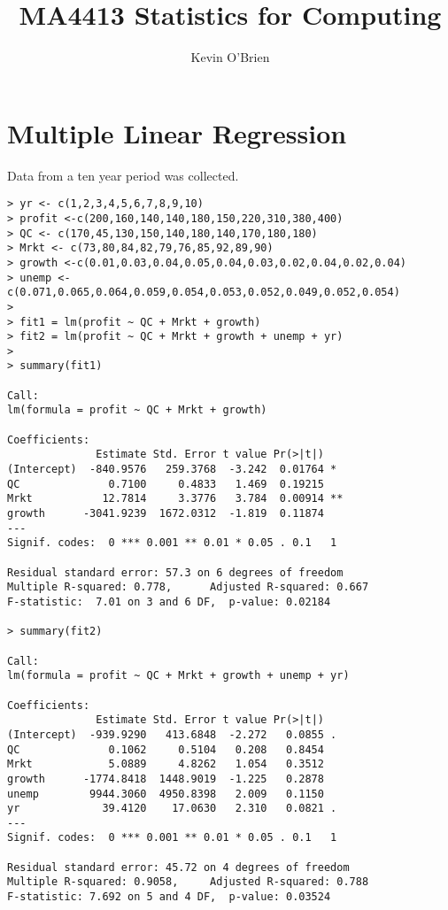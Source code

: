 \documentclass[10pt,a4paper]{article}
\title{MA4413 Statistics for Computing}
\author{Kevin O'Brien}
\begin{document}
\section{Multiple Linear Regression}
Data from a ten year period was collected.

\begin{verbatim}
> yr <- c(1,2,3,4,5,6,7,8,9,10)
> profit <-c(200,160,140,140,180,150,220,310,380,400)
> QC <- c(170,45,130,150,140,180,140,170,180,180)
> Mrkt <- c(73,80,84,82,79,76,85,92,89,90)
> growth <-c(0.01,0.03,0.04,0.05,0.04,0.03,0.02,0.04,0.02,0.04)
> unemp <-c(0.071,0.065,0.064,0.059,0.054,0.053,0.052,0.049,0.052,0.054)
>
> fit1 = lm(profit ~ QC + Mrkt + growth)
> fit2 = lm(profit ~ QC + Mrkt + growth + unemp + yr)
>
> summary(fit1)

Call:
lm(formula = profit ~ QC + Mrkt + growth)

Coefficients:
              Estimate Std. Error t value Pr(>|t|)
(Intercept)  -840.9576   259.3768  -3.242  0.01764 *
QC              0.7100     0.4833   1.469  0.19215
Mrkt           12.7814     3.3776   3.784  0.00914 **
growth      -3041.9239  1672.0312  -1.819  0.11874
---
Signif. codes:  0 *** 0.001 ** 0.01 * 0.05 . 0.1   1

Residual standard error: 57.3 on 6 degrees of freedom
Multiple R-squared: 0.778,      Adjusted R-squared: 0.667
F-statistic:  7.01 on 3 and 6 DF,  p-value: 0.02184

> summary(fit2)

Call:
lm(formula = profit ~ QC + Mrkt + growth + unemp + yr)

Coefficients:
              Estimate Std. Error t value Pr(>|t|)
(Intercept)  -939.9290   413.6848  -2.272   0.0855 .
QC              0.1062     0.5104   0.208   0.8454
Mrkt            5.0889     4.8262   1.054   0.3512
growth      -1774.8418  1448.9019  -1.225   0.2878
unemp        9944.3060  4950.8398   2.009   0.1150
yr             39.4120    17.0630   2.310   0.0821 .
---
Signif. codes:  0 *** 0.001 ** 0.01 * 0.05 . 0.1   1

Residual standard error: 45.72 on 4 degrees of freedom
Multiple R-squared: 0.9058,     Adjusted R-squared: 0.788
F-statistic: 7.692 on 5 and 4 DF,  p-value: 0.03524
\end{verbatim}
\end{document}
